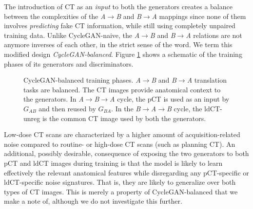 The introduction of CT as an \textit{input} to both the generators creates a balance between the complexities of the \textit{A}$\rightarrow$\textit{B} and \textit{B}$\rightarrow$\textit{A} mappings since none of them involves \textit{predicting} fake CT information, while still using completely unpaired training data. Unlike CycleGAN-naive, the \textit{A}$\rightarrow$\textit{B} and \textit{B}$\rightarrow$\textit{A} relations are not anymore inverses of each other, in the strict sense of the word. We term this modified design \textit{CycleGAN-balanced}. Figure \ref{fig:cyclegan_balanced} shows a schematic of the training phases of its generators and discriminators.

\begin{figure}[h!]
    \centering
    \caption{CycleGAN-balanced training phases. \textit{A}$\rightarrow$\textit{B} and \textit{B}$\rightarrow$\textit{A} translation tasks are balanced. The CT images provide anatomical context to the generators. In \textit{A}$\rightarrow$\textit{B}$\rightarrow$\textit{A} cycle, the pCT is used as an input by $G_{AB}$ and then reused by $G_{BA}$. In the \textit{B}$\rightarrow$\textit{A}$\rightarrow$\textit{B} cycle, the ldCT-unreg is the common CT image used by both the generators.}
    \label{fig:cyclegan_balanced}
\end{figure}{}

Low-dose CT scans are characterized by a higher amount of acquisition-related noise compared to routine- or high-dose CT scans (such as planning CT). An additional, possibly desirable, consequence of exposing the two generators to both pCT and ldCT images during training is that the model is likely to learn effectively the relevant anatomical features while disregarding any pCT-specific or ldCT-specific noise signatures. That is, they are likely to generalize over both types of CT images. This is merely a property of CycleGAN-balanced that we make a note of, although we do not investigate this further.


